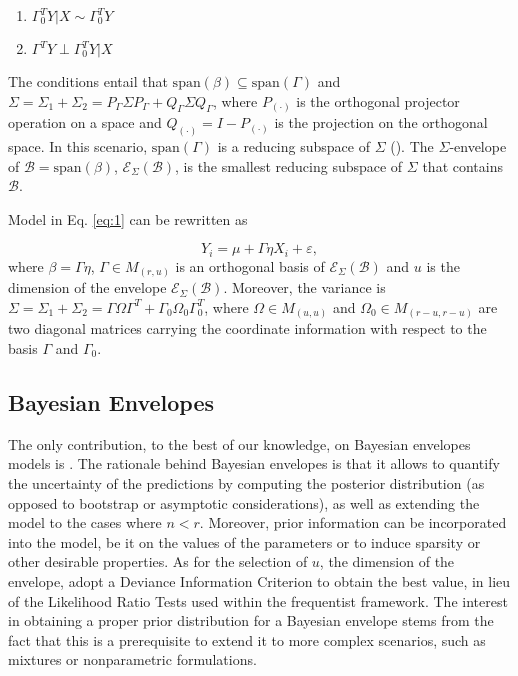 \documentclass[graybox]{svmult}
\begin{document}
\begin{enumerate}
\item $\Gamma_0^T Y | X \sim \Gamma_0^T Y$
\item $\Gamma^T Y \perp \Gamma_0^T Y | X$
\end{enumerate}

The conditions entail that
$\mathrm{span}\left( \beta \right) \subseteq \mathrm{span}\left(
  \Gamma \right)$ and
$\Sigma = \Sigma_1 + \Sigma_2 = P_{\Gamma}\Sigma P_{\Gamma} +
Q_{\Gamma} \Sigma Q_{\Gamma}$, where $P_{\left(\cdot\right)}$ is the
orthogonal projector operation on a space and
$Q_{\left(\cdot\right)} = I - P_{\left(\cdot\right)}$ is the
projection on the orthogonal space. In this scenario,
$\mathrm{span}\left( \Gamma \right)$ is a reducing subspace of
$\Sigma$ (\cite{cookENVELOPEMODELSPARSIMONIOUS2010}). The $\Sigma$-envelope of $\mathcal{B} = \mathrm{span}\left( \beta \right)$, $\mathcal{E}_{\Sigma} \left( \mathcal{B} \right)$, is the smallest reducing subspace of $\Sigma$ that contains $\mathcal{B}$.

Model in Eq. \ref{eq:1} can be rewritten as

\begin{equation}
  \label{eq:3}
  Y_i = \mu + \Gamma \eta X_i + \varepsilon,
\end{equation}
where $\beta = \Gamma \eta$, $\Gamma \in M_{\left( r, u \right)}$ is
an orthogonal basis of
$\mathcal{E}_{\Sigma}\left( \mathcal{B} \right)$ and $u$ is the
dimension of the envelope
$\mathcal{E}_{\Sigma}\left( \mathcal{B} \right)$. Moreover, the
variance is
$\Sigma = \Sigma_1 + \Sigma_2 = \Gamma \Omega \Gamma^T + \Gamma_0
\Omega_0 \Gamma_0^T$, where $\Omega \in M_{\left( u, u \right)}$ and $\Omega_0 \in M_{\left( r-u, r-u \right)}$ are two diagonal matrices carrying the coordinate information with respect to the basis $\Gamma$ and $\Gamma_0$.

\subsection{Bayesian Envelopes}
The only contribution, to the best of our knowledge, on Bayesian
envelopes models is \cite{khareBayesianApproachEnvelope2017}. The
rationale behind Bayesian envelopes is that it allows to quantify the
uncertainty of the predictions by computing the posterior distribution
(as opposed to bootstrap or asymptotic considerations), as well as
extending the model to the cases where $n < r$. Moreover, prior
information can be incorporated into the model, be it on the values of
the parameters or to induce sparsity or other desirable properties. As
for the selection of $u$, the dimension of the envelope,
\cite{khareBayesianApproachEnvelope2017} adopt a Deviance Information
Criterion to obtain the best value, in lieu of the Likelihood Ratio
Tests used within the frequentist framework.  The interest in
obtaining a proper prior distribution for a Bayesian envelope stems
from the fact that this is a prerequisite to extend it to more complex
scenarios, such as mixtures or nonparametric formulations.
\end{document}
